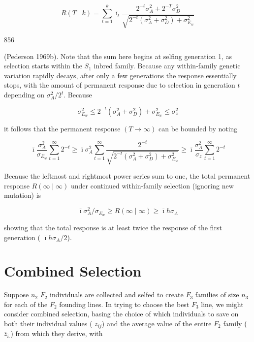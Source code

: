 \documentclass{article}
\begin{document}
\begin{equation}
R(T\mid k)=\sum_{t=1}^{k}\bar{\imath}_{t}\frac{2^{-t}\sigma_{A}^{2}+2^{-T}\sigma_{D}^{2}}{\sqrt{2^{-t}\left(\sigma_{A}^{2}+\sigma_{D}^{2}\right)+\sigma_{E_{w}}^{2}}}
\tag{23.42d}
\label{eq:23_42d}
\end{equation}

856

(Pederson 1969b). Note that the sum here begins at selfing generation 1, as selection starts within the  $ S_1 $ inbred family. Because any within-family genetic variation rapidly decays, after only a few generations the response essentially stops, with the amount of permanent response due to selection in generation  $ t $ depending on  $ \sigma_A^2 / 2^t $. Because

\begin{equation}
\sigma_{E_{w}}^{2}\leq2^{-t}\left(\sigma_{A}^{2}+\sigma_{D}^{2}\right)+\sigma_{E_{w}}^{2}\leq\sigma_{z}^{2}
\tag{23.43a}
\label{eq:23_43a}
\end{equation}

it follows that the permanent response  $ (T \to \infty) $ can be bounded by noting

\begin{equation}
\bar{\imath}\frac{\sigma_{A}^{2}}{\sigma_{E_{w}}}\sum_{t=1}^{\infty}2^{-t}\geq\bar{\imath}\sigma_{A}^{2}\sum_{t=1}^{\infty}\frac{2^{-t}}{\sqrt{2^{-t}\left(\sigma_{A}^{2}+\sigma_{D}^{2}\right)+\sigma_{E_{w}}^{2}}}\geq\bar{\imath}\frac{\sigma_{A}^{2}}{\sigma_{z}}\sum_{t=1}^{\infty}2^{-t}
\tag{23.43b}
\label{eq:23_43b}
\end{equation}

Because the leftmost and rightmost power series sum to one, the total permanent response  $ R(\infty \mid \infty) $ under continued within-family selection (ignoring new mutation) is

\begin{equation}
\bar{\imath}\sigma_{A}^{2}/\sigma_{E_{w}}\geq R(\infty\mid\infty)\geq\bar{\imath}h\sigma_{A}
\tag{23.43c}
\label{eq:23_43c}
\end{equation}

showing that the total response is at least twice the response of the first generation ( $ \bar{\imath}h\sigma_{A}/2 $).

\section{Combined Selection}
Suppose  $ n_2 $  $ F_2 $ individuals are collected and selfed to create  $ F_3 $ families of size  $ n_3 $ for each of the  $ F_2 $ founding lines. In trying to choose the best  $ F_3 $ line, we might consider combined selection, basing the choice of which individuals to save on both their individual values ( $ z_{ij} $) and the average value of the entire  $ F_2 $ family ( $ \overline{z}_{i.} $) from which they derive, with
\end{document}
